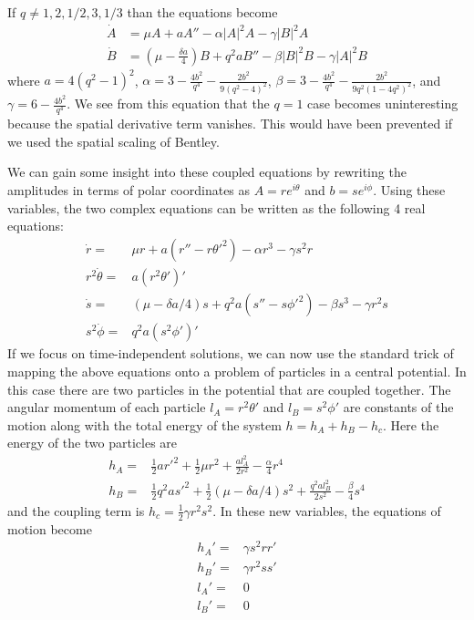 \documentclass[api,pof,pre,12pt,a4paper]{revtex4-1}
\begin{document}
If $q\neq 1,2,1/2,3, 1/3$ than the equations become
\begin{align}
\dot{A}&=\mu A+a  A''-\alpha|A|^2A-\gamma|B|^2 A\\
\dot{B}&=\left(\mu-\frac{\delta a}{4}\right) B+q^2 a  B''-\beta|B|^2B-\gamma|A|^2 B
\end{align}
where $a=4(q^2-1)^2$, $\alpha=3-\tfrac{4 b^2}{q^4}-\tfrac{2 b^2}{9(q^2-4)^2}$, $\beta=3-\tfrac{4 b^2}{q^4}-\tfrac{2 b^2}{9q^2(1-4q^2)^2}$, and $\gamma=6-\frac{4 b^2}{q^4}$. We see from this equation that the $q=1$ case becomes uninteresting because the spatial derivative term vanishes.  This would have been prevented if we used the spatial scaling of Bentley.

We can gain some insight into these coupled equations by rewriting the amplitudes in terms of polar coordinates as $A=r e^{i\theta}$ and $b= s e^{i\phi}$.  Using these variables, the two complex equations can be written as the following 4 real equations:
\begin{subequations}
\begin{align}
\dot{r}=&\mu r + a(r'' - r\theta'^2) -\alpha r^3-\gamma s^2 r
\label{eq:rpolar} \\
r^2\dot{\theta}=&a(r^2\theta')'
\label{eq:thpolar}\\
\dot{s}=&(\mu-\delta a/4) s + q^2 a(s'' - s\phi'^2) -\beta s^3-\gamma r^2 s
\label{eq:spolar}\\
s^2\dot{\phi}=&q^2 a (s^2\phi')'
\label{eq:phpolar}
\end{align}
\end{subequations}
If we focus on time-independent solutions, we can now use the standard trick of mapping the above equations onto a problem of particles in a central potential.  In this case there are two particles in the potential that are coupled together.  The angular momentum of each particle $l_A=r^2\theta'$ and $l_B=s^2\phi'$ are constants of the motion along with the total energy of the system $h=h_A+h_B - h_c$.  Here the energy of the two particles are 
\begin{subequations}
\begin{align}
h_A=&\frac{1}{2} a r'^2 +\frac{1}{2}\mu r^2 + \frac{al_A^2}{2r^2}-\frac{\alpha}{4}r^4
\label{eq:hA} \\
h_B=&\frac{1}{2}q^2 a s'^2 +\frac{1}{2}(\mu-\delta a/4) s^2 + \frac{q^2al_B^2}{2s^2}-\frac{\beta}{4}s^4
\label{eq:hBr}
\end{align}
\end{subequations}
and the coupling term is $h_c=\frac{1}{2}\gamma r^2 s^2$.  In these new variables, the equations of motion become
\begin{subequations}
\begin{align}
h_A'=&\gamma s^2r r'\\
h_B'=&\gamma r^2 s s'\\
l_A'=&0\\
l_B'=&0
\end{align}
\end{subequations}
\end{document}
